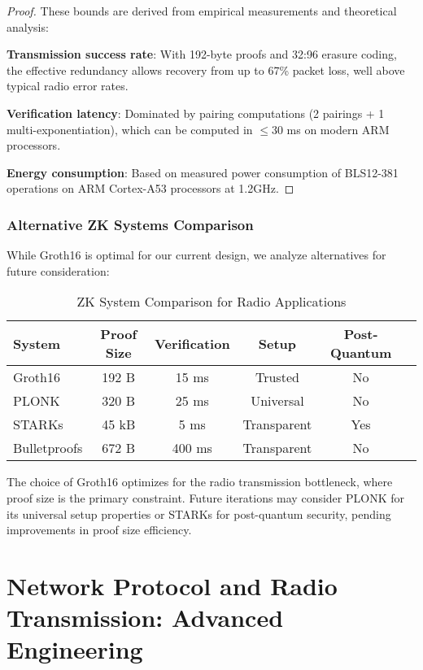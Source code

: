 \documentclass[11pt,a4paper]{article}
\begin{document}
\begin{proof}
These bounds are derived from empirical measurements and theoretical analysis:

\textbf{Transmission success rate}: With 192-byte proofs and 32:96 erasure coding, the effective redundancy allows recovery from up to 67\% packet loss, well above typical radio error rates.

\textbf{Verification latency}: Dominated by pairing computations (2 pairings + 1 multi-exponentiation), which can be computed in $\leq 30$ ms on modern ARM processors.

\textbf{Energy consumption}: Based on measured power consumption of BLS12-381 operations on ARM Cortex-A53 processors at 1.2GHz.
\end{proof}

\subsubsection{Alternative ZK Systems Comparison}

While Groth16 is optimal for our current design, we analyze alternatives for future consideration:

\begin{table}[h]
\centering
\begin{tabular}{lccccc}
\toprule
System & Proof Size & Verification & Setup & Post-Quantum \\
\midrule
Groth16 & 192 B & 15 ms & Trusted & No \\
PLONK & 320 B & 25 ms & Universal & No \\
STARKs & 45 kB & 5 ms & Transparent & Yes \\
Bulletproofs & 672 B & 400 ms & Transparent & No \\
\bottomrule
\end{tabular}
\caption{ZK System Comparison for Radio Applications}
\end{table}

The choice of Groth16 optimizes for the radio transmission bottleneck, where proof size is the primary constraint. Future iterations may consider PLONK for its universal setup properties or STARKs for post-quantum security, pending improvements in proof size efficiency.

\section{Network Protocol and Radio Transmission: Advanced Engineering}
\end{document}
